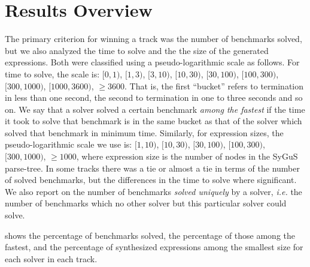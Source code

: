 \section{Results Overview}
\label{sec:comp-results}



The primary criterion for winning a track was the number of benchmarks solved,
but we also analyzed the time to solve and the the size of the generated expressions.
Both were classified using a pseudo-logarithmic scale as follows.
For time to solve, the scale is: $[0,1)$, $[1,3)$, $[3,10)$, $[10,30)$, $[30, 100)$,
$[100,300)$, $[300, 1000)$, $[1000,3600)$, $\geqslant 3600$.
That is, the first ``bucket'' refers to termination in less than one second,
the second to termination in one to three seconds and so on.
We say that a solver solved a certain benchmark \emph{among the fastest}
if the time it took to solve that benchmark is in the same bucket
as that of the solver which solved that benchmark in minimum time.
Similarly, for expression sizes, the pseudo-logarithmic scale we use is:
$[1,10)$, $[10,30)$, $[30,100)$, $[100,300)$, $[300,1000)$, $\geqslant 1000$,
where expression size is the number of nodes in the SyGuS parse-tree.
In some tracks there was a tie or almost a tie in terms of the number of solved benchmarks,
but the differences in the time to solve where significant.
We also report on the number of benchmarks \emph{solved uniquely} by a solver,
\emph{i.e.} the number of benchmarks which no other solver but this particular solver could solve.

 shows the percentage of benchmarks solved,
the percentage of those among the fastest,
and the percentage of synthesized expressions among the smallest size
for each solver in each track.

